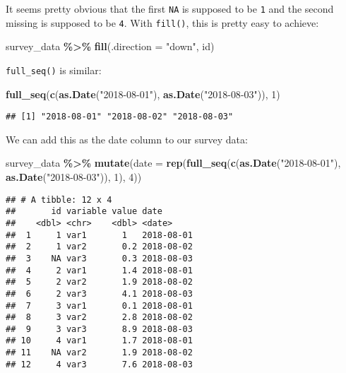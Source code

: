 \documentclass[
]{article}
\newenvironment{Shaded}{\begin{snugshade}}{\end{snugshade}}
\newcommand{\DataTypeTok}[1]{\textcolor[rgb]{0.13,0.29,0.53}{#1}}
\newcommand{\DecValTok}[1]{\textcolor[rgb]{0.00,0.00,0.81}{#1}}
\newcommand{\KeywordTok}[1]{\textcolor[rgb]{0.13,0.29,0.53}{\textbf{#1}}}
\newcommand{\NormalTok}[1]{#1}
\newcommand{\OperatorTok}[1]{\textcolor[rgb]{0.81,0.36,0.00}{\textbf{#1}}}
\newcommand{\StringTok}[1]{\textcolor[rgb]{0.31,0.60,0.02}{#1}}
\begin{document}
It seems pretty obvious that the first \texttt{NA} is supposed to be \texttt{1} and the second missing is supposed
to be \texttt{4}. With \texttt{fill()}, this is pretty easy to achieve:

\begin{Shaded}
\begin{Highlighting}[]
\NormalTok{survey\_data }\OperatorTok{\%\textgreater{}\%}
\StringTok{    }\KeywordTok{fill}\NormalTok{(}\DataTypeTok{.direction =} \StringTok{"down"}\NormalTok{, id)}
\end{Highlighting}
\end{Shaded}

\texttt{full\_seq()} is similar:

\begin{Shaded}
\begin{Highlighting}[]
\KeywordTok{full\_seq}\NormalTok{(}\KeywordTok{c}\NormalTok{(}\KeywordTok{as.Date}\NormalTok{(}\StringTok{"2018{-}08{-}01"}\NormalTok{), }\KeywordTok{as.Date}\NormalTok{(}\StringTok{"2018{-}08{-}03"}\NormalTok{)), }\DecValTok{1}\NormalTok{)}
\end{Highlighting}
\end{Shaded}

\begin{verbatim}
## [1] "2018-08-01" "2018-08-02" "2018-08-03"
\end{verbatim}

We can add this as the date column to our survey data:

\begin{Shaded}
\begin{Highlighting}[]
\NormalTok{survey\_data }\OperatorTok{\%\textgreater{}\%}
\StringTok{    }\KeywordTok{mutate}\NormalTok{(}\DataTypeTok{date =} \KeywordTok{rep}\NormalTok{(}\KeywordTok{full\_seq}\NormalTok{(}\KeywordTok{c}\NormalTok{(}\KeywordTok{as.Date}\NormalTok{(}\StringTok{"2018{-}08{-}01"}\NormalTok{), }\KeywordTok{as.Date}\NormalTok{(}\StringTok{"2018{-}08{-}03"}\NormalTok{)), }\DecValTok{1}\NormalTok{), }\DecValTok{4}\NormalTok{))}
\end{Highlighting}
\end{Shaded}

\begin{verbatim}
## # A tibble: 12 x 4
##       id variable value date      
##    <dbl> <chr>    <dbl> <date>    
##  1     1 var1       1   2018-08-01
##  2     1 var2       0.2 2018-08-02
##  3    NA var3       0.3 2018-08-03
##  4     2 var1       1.4 2018-08-01
##  5     2 var2       1.9 2018-08-02
##  6     2 var3       4.1 2018-08-03
##  7     3 var1       0.1 2018-08-01
##  8     3 var2       2.8 2018-08-02
##  9     3 var3       8.9 2018-08-03
## 10     4 var1       1.7 2018-08-01
## 11    NA var2       1.9 2018-08-02
## 12     4 var3       7.6 2018-08-03
\end{verbatim}
\end{document}
